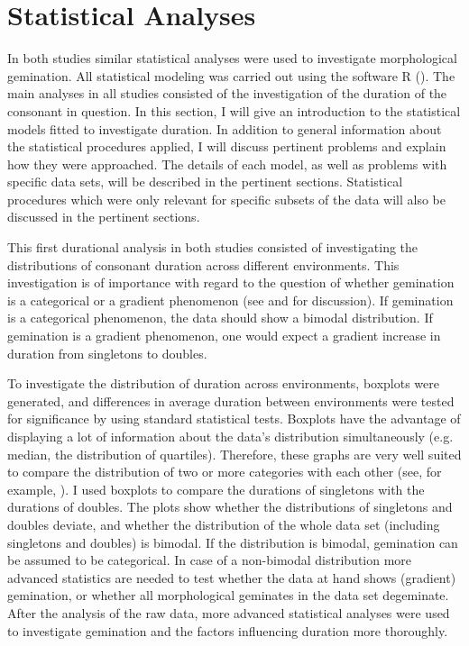 \section{Statistical Analyses}\label{stats}

In both studies similar statistical analyses were used to investigate morphological gemination. All statistical modeling was carried out using the software R (\citealt{RDevelopmentCoreTeam.2014}). 
The main analyses in all studies consisted of the investigation of the duration of the consonant in question. 
In this section, I will give an introduction to the statistical models fitted to investigate duration. In addition to general information about the statistical procedures applied, I will discuss pertinent problems and explain how they were approached. The details of each model, as well as problems with specific data sets, will be described in the pertinent sections. Statistical procedures which were only relevant for specific subsets of the data will also be discussed in the pertinent sections. 




This first durational analysis in both studies consisted of investigating the distributions of consonant duration across different environments. This investigation is of importance with regard to the question of whether gemination is a categorical or a gradient phenomenon (see  and  for discussion). If gemination is a categorical phenomenon, the data should show a bimodal distribution. If gemination is a gradient phenomenon, one would expect a gradient increase in duration from singletons to doubles.

 To investigate the distribution of duration across environments, boxplots were generated, and differences in average duration between environments were tested for significance by using standard statistical tests. Boxplots have the advantage of displaying a lot of information about the data's distribution simultaneously (e.g. median, the distribution of quartiles). Therefore, these graphs are very well suited to compare the distribution of two or more categories with each other (see, for example, \citealt{Benjamini.1988}).  
 I used boxplots to compare the durations of singletons with the durations of doubles. The plots show whether the distributions of singletons and doubles deviate, and whether the distribution of the whole data set (including singletons and doubles) is bimodal. If the distribution is bimodal, gemination can be assumed to be categorical.
  In case of a non-bimodal distribution more advanced statistics are needed to test whether the data at hand shows (gradient) gemination, or whether all morphological geminates in the data set degeminate.
 After the analysis of the raw data, more advanced statistical analyses were used to investigate gemination and the factors influencing duration more thoroughly.


